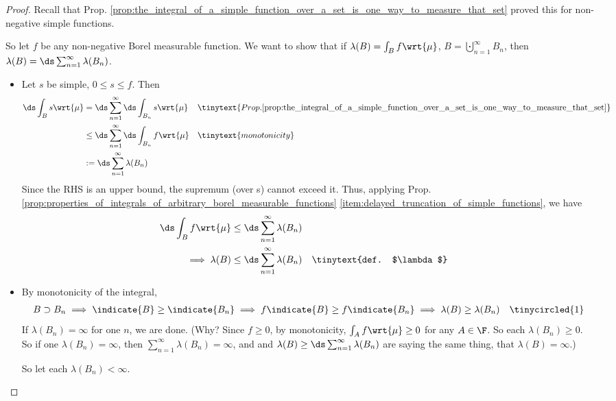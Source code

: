 \documentclass{article} %
\begin{document}
\begin{proof}
Recall that Prop. \ref{prop:the_integral_of_a_simple_function_over_a_set_is_one_way_to_measure_that_set}  proved this for non-negative simple functions.


So let $f$ be any non-negative Borel measurable function.   We want to show that if $\lambda(B) = \int_B f \wrt{\mu}$,  $B = \bigcupdot_{n=1}^\infty B_n$, then $\lambda(B) = \ds\sum_{n=1}^\infty \lambda(B_n)$.

\begin{itemize}
\item \framebox{$\leq$} Let $s$ be simple, $0 \leq s \leq f$.   Then 
\begin{align*}
\ds\int_B s \wrt{\mu} &= \ds\sum_{n=1}^\infty \ds\int_{B_n} s \wrt{\mu} && \tinytext{Prop. \ref{prop:the_integral_of_a_simple_function_over_a_set_is_one_way_to_measure_that_set}} \\
&\leq \ds\sum_{n=1}^\infty \ds\int_{B_n} f \wrt{\mu}  && \tinytext{monotonicity} \\ 
&:= \ds\sum_{n=1}^\infty \lambda(B_n) 	
\end{align*}
Since the RHS is an upper bound, the supremum (over s) cannot exceed it.  Thus, applying Prop. \ref{prop:properties_of_integrals_of_arbitrary_borel_measurable_functions} \ref{item:delayed_truncation_of_simple_functions}, we have 
\begin{align*}
\ds\int_B f \wrt{\mu} & \leq \ds\sum_{n=1}^\infty \lambda(B_n)  \\ 
\implies \lambda(B) &\leq \ds\sum_{n=1}^\infty \lambda(B_n) && \tinytext{def. $\lambda$}
\end{align*}

\item \framebox{$\geq$}	By monotonicity of the integral, 
\begin{align*}
B \supset B_n \implies \indicate{B} \geq \indicate{B_n} \implies  f\indicate{B}   \geq f\indicate{B_n} \implies \lambda(B) \geq \lambda(B_n) && \tinycircled{1}
\end{align*} 
If $\lambda(B_n) =\infty$ for one $n$, we are done. {\tiny (Why? Since $f \geq 0$, by monotonicity, $\int_A f \wrt{\mu} \geq 0$ for any $A \in \F$.  So each $\lambda(B_n) \geq 0$.  So if one $\lambda(B_n) = \infty$, then $\sum_{n=1}^\infty \lambda(B_n) = \infty$, and  and $\lambda(B) \geq \ds\sum_{n=1}^\infty \lambda(B_n)$ are saying the same thing, that $\lambda(B) = \infty$.)}
 
 So let each $\lambda(B_n) < \infty$.  
 

\end{itemize}
\end{proof}
\end{document}
